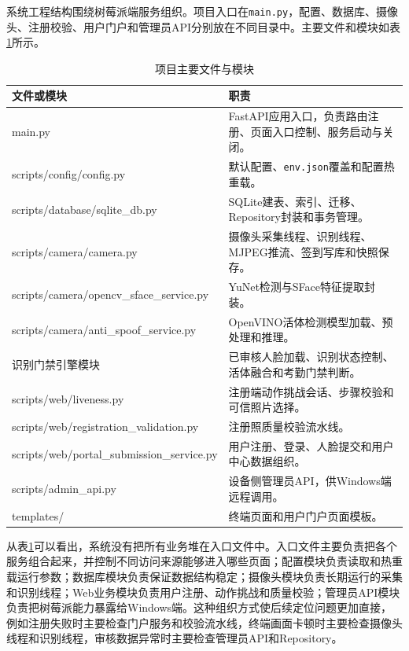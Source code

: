 系统工程结构围绕树莓派端服务组织。项目入口在\texttt{main.py}，配置、数据库、摄像头、注册校验、用户门户和管理员API分别放在不同目录中。主要文件和模块如表\ref{tab:project_structure}所示。

\begin{table}[H]
    \centering
    \caption{项目主要文件与模块}
    \label{tab:project_structure}
    \begin{tabularx}{\textwidth}{p{5cm}X}
        \toprule
        \textbf{文件或模块} & \textbf{职责} \\
        \midrule
        main.py & FastAPI应用入口，负责路由注册、页面入口控制、服务启动与关闭。 \\
        scripts/config/config.py & 默认配置、\texttt{env.json}覆盖和配置热重载。 \\
        scripts/database/sqlite\_db.py & SQLite建表、索引、迁移、Repository封装和事务管理。 \\
        scripts/camera/camera.py & 摄像头采集线程、识别线程、MJPEG推流、签到写库和快照保存。 \\
        scripts/camera/opencv\_sface\_service.py & YuNet检测与SFace特征提取封装。 \\
        scripts/camera/anti\_spoof\_service.py & OpenVINO活体检测模型加载、预处理和推理。 \\
        识别门禁引擎模块 & 已审核人脸加载、识别状态控制、活体融合和考勤门禁判断。 \\
        scripts/web/liveness.py & 注册端动作挑战会话、步骤校验和可信照片选择。 \\
        scripts/web/registration\_validation.py & 注册照质量校验流水线。 \\
        scripts/web/portal\_submission\_service.py & 用户注册、登录、人脸提交和用户中心数据组织。 \\
        scripts/admin\_api.py & 设备侧管理员API，供Windows端远程调用。 \\
        templates/ & 终端页面和用户门户页面模板。 \\
        \bottomrule
    \end{tabularx}
\end{table}

从表\ref{tab:project_structure}可以看出，系统没有把所有业务堆在入口文件中。入口文件主要负责把各个服务组合起来，并控制不同访问来源能够进入哪些页面；配置模块负责读取和热重载运行参数；数据库模块负责保证数据结构稳定；摄像头模块负责长期运行的采集和识别线程；Web业务模块负责用户注册、动作挑战和质量校验；管理员API模块负责把树莓派能力暴露给Windows端。这种组织方式使后续定位问题更加直接，例如注册失败时主要检查门户服务和校验流水线，终端画面卡顿时主要检查摄像头线程和识别线程，审核数据异常时主要检查管理员API和Repository。

